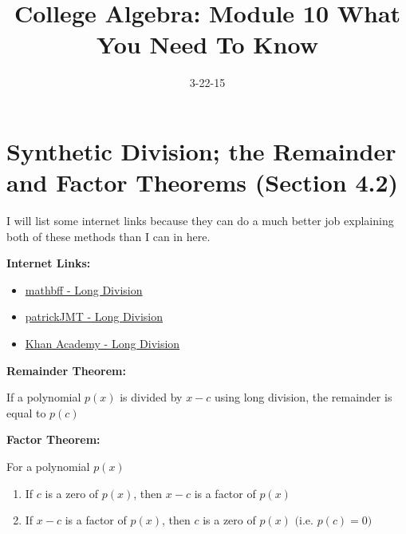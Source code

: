\documentclass[12pt]{article}
\newenvironment{myindentpar}[1]%
     {\begin{list}{}%
             {\setlength{\leftmargin}{#1}}%
             \item[]%
     }
     {\end{list}}
\begin{document}
\title{College Algebra: Module 10 What You Need To Know}
\date{3-22-15}
\author{}
\maketitle

\section{Synthetic Division; the Remainder and Factor Theorems (Section 4.2)}


I will list some internet links because they can do a much better job explaining both of these methods than I can in here.

\textbf{Internet Links:}

\begin{itemize}
\item \href{https://www.youtube.com/watch?v=Ih1wb6AxhMI}{mathbff - Long Division} 

\item \href{https://www.youtube.com/watch?v=l6_ghhd7kwQ}{patrickJMT - Long Division}

\item \href{https://www.youtube.com/watch?v=FXgV9ySNusc}{Khan Academy - Long Division}

\end{itemize}

\textbf{Remainder Theorem:}

\begin{myindentpar}{1cm}

If a polynomial $p(x)$ is divided by $x-c$ using long division, the remainder is equal to $p(c)$
\end{myindentpar}

\textbf{Factor Theorem:}

\begin{myindentpar}{1cm}

For a polynomial $p(x)$

\begin{enumerate}

\item If $c$ is a zero of $p(x)$, then $x-c$ is a factor of $p(x)$
\item If $x-c$ is a factor of $p(x)$, then $c$ is a zero of $p(x)$ $\Big($i.e. $p(c) = 0\Big)$

\end{enumerate}

\end{myindentpar}
\end{document}
